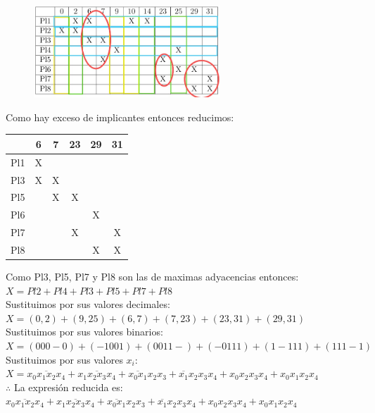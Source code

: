 \documentclass[a4paper,12pt]{article}
\begin{document}
\begin{enumerate}[label=\textcolor{teal}{\textbf{\arabic*.}}]
        \begin{figure}[H]
            \centering
            \includegraphics[width=7cm]{img/12.png}
        \end{figure}

        Como hay exceso de implicantes entonces reducimos:
        \begin{table} [H]
            \centering
            \begin{tabular}{|c|c|c|c|c|c|}
                \hline
                    & 6 & 7  & 23 & 29 & 31\\ \hline
                Pl1 & X &    &    &    &   \\ \hline 
                \rowcolor{yellow!50} Pl3 & X & X  &    &    &   \\ \hline 
                \rowcolor{yellow!50} Pl5 &  & X  &  X &    &   \\ \hline 
                Pl6 &  &    &    & X  &   \\ \hline 
                \rowcolor{yellow!50} Pl7 &  &    & X  &    & X \\ \hline 
                \rowcolor{yellow!50} Pl8 &  &    &    & X  & X \\ \hline 
            \end{tabular}
        \end{table}
        Como Pl3, Pl5, Pl7 y Pl8 son las de maximas adyacencias entonces:\\
        $X = Pl2 + Pl4 + Pl3 + Pl5 + Pl7 + Pl8$\\
        Sustituimos por sus valores decimales:\\
        $X = (0,2) + (9,25) + (6,7) + (7,23) + (23,31) + (29,31)$\\
        Sustituimos por sus valores binarios:\\
        $X = (000-0) + (-1001) + (0011-) + (-0111) + (1-111) + (111-1)$\\
        Sustituimos por sus valores $x_{i}$:\\
        $X = \overline{x_0 x_1 x_2 x_4} + x_1 \overline{x_2 x_3} x_4 + \overline{x_0 x_1} x_2 x_3 + \overline{x_1} x_2 x_3 x_4 + x_0 x_2 x_3 x_4 + x_0 x_1 x_2 x_4$\\
        $\therefore$ La expresión reducida es: \\
        $\overline{x_0 x_1 x_2 x_4} + x_1 \overline{x_2 x_3} x_4 + \overline{x_0 x_1} x_2 x_3 + \overline{x_1} x_2 x_3 x_4 + x_0 x_2 x_3 x_4 + x_0 x_1 x_2 x_4$\\


\end{enumerate}


\newpage
\nocite{*}
\printbibliography
\end{document}

